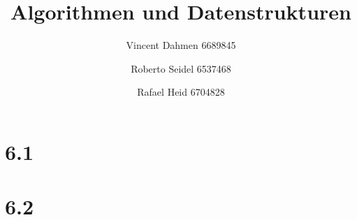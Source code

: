 \documentclass[12pt,a4paper]{article}
\title{Algorithmen und Datenstrukturen}
\author{Vincent Dahmen 6689845 \and Roberto Seidel 6537468 \and Rafael Heid 6704828}
\begin{document}
\maketitle{}


\section*{6.1}










\section*{6.2}

\end{document}
